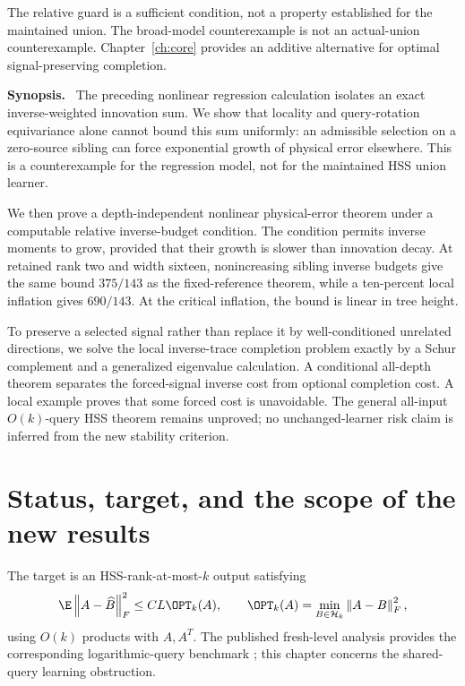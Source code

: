 \documentclass[11pt,oneside,openany,a4paper]{book}
\numberwithin{equation}{chapter}
\theoremstyle{definition}
\theoremstyle{remark}
\newenvironment{chaptersynopsis}{\begingroup\small\textbf{Synopsis.}\ }{\par\endgroup\medskip}
\newcommand{\F}[1]{\left\lVert#1\right\rVert_F}
\begin{document}
\begin{scopebox}
The relative guard is a sufficient condition, not a property established for the maintained union. The broad-model counterexample is not an actual-union counterexample. Chapter~\ref{ch:core} provides an additive alternative for optimal signal-preserving completion.
\end{scopebox}
\thispagestyle{plain}
\begin{chaptersynopsis}
The preceding nonlinear regression calculation isolates an exact inverse-weighted innovation sum. We show that locality and query-rotation equivariance alone cannot bound this sum uniformly: an admissible selection on a zero-source sibling can force exponential growth of physical error elsewhere. This is a counterexample for the regression model, not for the maintained HSS union learner.

We then prove a depth-independent nonlinear physical-error theorem under a computable relative inverse-budget condition. The condition permits inverse moments to grow, provided that their growth is slower than innovation decay. At retained rank two and width sixteen, nonincreasing sibling inverse budgets give the same bound $375/143$ as the fixed-reference theorem, while a ten-percent local inflation gives $690/143$. At the critical inflation, the bound is linear in tree height.

To preserve a selected signal rather than replace it by well-conditioned unrelated directions, we solve the local inverse-trace completion problem exactly by a Schur complement and a generalized eigenvalue calculation. A conditional all-depth theorem separates the forced-signal inverse cost from optional completion cost. A local example proves that some forced cost is unavoidable. The general all-input $O(k)$-query HSS theorem remains unproved; no unchanged-learner risk claim is inferred from the new stability criterion.
\end{chaptersynopsis}


\section{Status, target, and the scope of the new results}
The target is an HSS-rank-at-most-$k$ output satisfying
\[
 \E\F{A-\widehat B}^2\le CL\OPT_k(A),\qquad
 \OPT_k(A)=\min_{B\in\mathcal H_k}\F{A-B}^2,
\]
using $O(k)$ products with $A,A^T$. The published fresh-level analysis provides the corresponding logarithmic-query benchmark \cite{AmselHSS}; this chapter concerns the shared-query learning obstruction.
\end{document}
